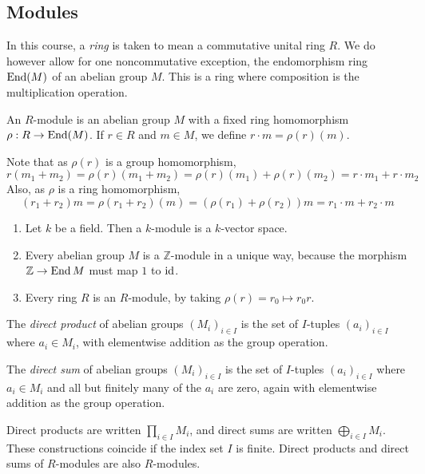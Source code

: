 \subsection{Modules}
In this course, a \emph{ring} is taken to mean a commutative unital ring \( R \).
We do however allow for one noncommutative exception, the endomorphism ring \( \operatorname{End}(M) \) of an abelian group \( M \).
This is a ring where composition is the multiplication operation.
\begin{definition}
    An \( R \)-module is an abelian group \( M \) with a fixed ring homomorphism \( \rho : R \to \operatorname{End}(M) \).
    If \( r \in R \) and \( m \in M \), we define \( r \cdot m = \rho(r)(m) \).
\end{definition}
\begin{remark}
    Note that as \( \rho(r) \) is a group homomorphism,
    \[ r(m_1 + m_2) = \rho(r)(m_1 + m_2) = \rho(r)(m_1) + \rho(r)(m_2) = r \cdot m_1 + r \cdot m_2 \]
    Also, as \( \rho \) is a ring homomorphism,
    \[ (r_1 + r_2)m = \rho(r_1 + r_2)(m) = (\rho(r_1) + \rho(r_2))m = r_1 \cdot m + r_2 \cdot m \]
\end{remark}
\begin{example}
    \begin{enumerate}
        \item Let \( k \) be a field.
        Then a \( k \)-module is a \( k \)-vector space.
        \item Every abelian group \( M \) is a \( \mathbb Z \)-module in a unique way, because the morphism \( \mathbb Z \to \operatorname{End} M \) must map \( 1 \) to \( \operatorname{id} \).
        \item Every ring \( R \) is an \( R \)-module, by taking \( \rho(r) = r_0 \mapsto r_0 r \).
    \end{enumerate}
\end{example}
\begin{definition}
    The \emph{direct product} of abelian groups \( (M_i)_{i \in I} \) is the set of \( I \)-tuples \( (a_i)_{i \in I} \) where \( a_i \in M_i \), with elementwise addition as the group operation.
\end{definition}
\begin{definition}
    The \emph{direct sum} of abelian groups \( (M_i)_{i \in I} \) is the set of \( I \)-tuples \( (a_i)_{i \in I} \) where \( a_i \in M_i \) and all but finitely many of the \( a_i \) are zero, again with elementwise addition as the group operation.
\end{definition}
Direct products are written \( \prod_{i \in I} M_i \), and direct sums are written \( \bigoplus_{i \in I} M_i \).
These constructions coincide if the index set \( I \) is finite.
Direct products and direct sums of \( R \)-modules are also \( R \)-modules.

